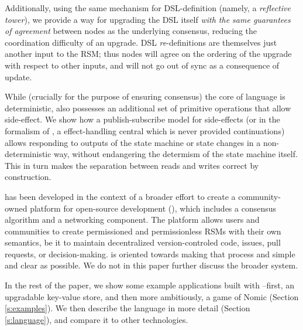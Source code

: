 Additionally, using the same mechanism for DSL-definition (namely, a
\textit{reflective tower}), we provide a way for upgrading the DSL itself
\textit{with the same guarantees of agreement} between nodes as the underlying
consensus, reducing the coordination difficulty of an upgrade. DSL
\textit{re}-definitions are themselves just another input to the RSM; thus
nodes will agree on the ordering of the upgrade with respect to other inputs,
and will not go out of sync as a consequence of update.

While (crucially for the purpose of ensuring consensus) the core of language is
deterministic, \rad also possesses an additional set of primitive operations
that allow side-effect. We show how a publish-subscribe model for side-effects
(or in the formalism of \cite{Cartwright1994}, a effect-handling central which
is never provided continuations) allows responding to outputs of the state
machine or state changes in a non-deterministic way, without endangering the
determism of the state machine itself. This in turn makes the separation
between reads and writes correct by construction.

\rad has been developed in the context of a broader effort to create a
community-owned platform for open-source development (\oscoin{}), which
includes a consensus algorithm and a networking component. The \oscoin{}
platform allows users and communities to create permissioned and permissionless
RSMs with their own semantics, be it to maintain decentralized
version-controled code, issues, pull requests, or decision-making. \rad is
oriented towards making that process and simple and clear as possible. We do
not in this paper further discuss the broader \oscoin{} system.

In the rest of the paper, we show some example applications built with
\rad--first, an upgradable key-value store, and then more ambitiously, a game
of Nomic (Section \ref{s:examples}). We then describe the language in more
detail (Section \ref{s:language}), and compare it to other technologies.
